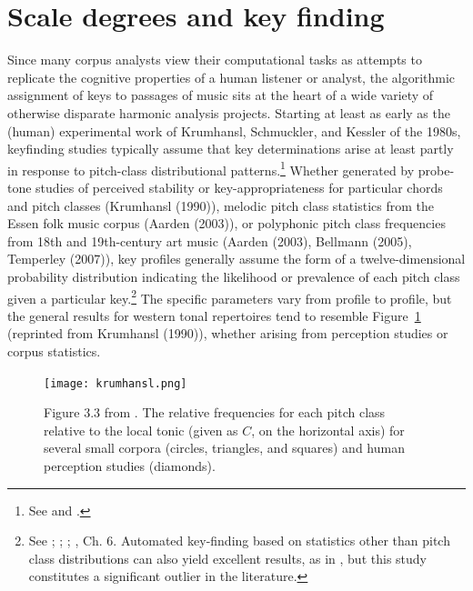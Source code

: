 \section{Scale degrees and key finding}

Since many corpus analysts view their computational tasks as attempts to replicate the cognitive properties of a human listener or analyst, the algorithmic assignment of keys to passages of music sits at the heart of a wide variety of otherwise disparate harmonic analysis projects.  Starting at least as early as the (human) experimental work of Krumhansl, Schmuckler, and Kessler of the 1980s, keyfinding studies typically assume that key determinations arise at least partly in response to pitch-class distributional patterns.\footnote{See \cite{krumhansl1982} and \cite{krumhansl1990}.}  Whether generated by probe-tone studies of perceived stability or key-appropriateness for particular chords and pitch classes (Krumhansl (1990)), melodic pitch class statistics from the Essen folk music corpus (Aarden (2003)), or polyphonic pitch class frequencies from 18th and 19th-century art music (Aarden (2003), Bellmann (2005), Temperley (2007)), key profiles generally assume the form of a twelve-dimensional probability distribution indicating the likelihood or prevalence of each pitch class given a particular key.\footnote{See \cite{krumhansl1990}; \cite{aarden2003}; \cite{bellmann2005}; \cite{temperley2007}, Ch. 6.  Automated key-finding based on statistics other than pitch class distributions can also yield excellent results, as in \cite{quinn2010}, but this study constitutes a significant outlier in the literature.} The specific parameters vary from profile to profile, but the general results for western tonal repertoires tend to resemble Figure~\ref{krumhansl} (reprinted from Krumhansl (1990)), whether arising from perception studies or corpus statistics.

\begin{figure}%
	\centering
	\caption{Figure 3.3 from \cite{krumhansl1990}.  The relative frequencies for each pitch class relative to the local tonic (given as $C$, on the horizontal axis) for several small corpora (circles, triangles, and squares) and human perception studies (diamonds).}
	\texttt{[image: krumhansl.png]}
	\label{krumhansl}
\end{figure}

